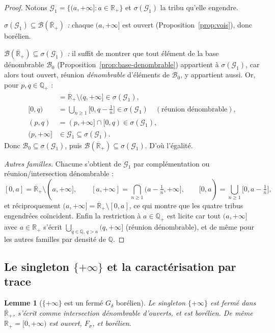 \documentclass[11pt,a4paper]{article}
\theoremstyle{plain}
\newtheorem{lemma}[theorem]{Lemme}
\theoremstyle{definition}
\newcommand{\Q}{\mathbb{Q}}
\newcommand{\Rp}{\mathbb{R}_+}
\newcommand{\Rpb}{\overline{\mathbb{R}}_+}
\newcommand{\B}{\mathcal{B}}
\newcommand{\sig}{\sigma}
\begin{document}
\begin{proof}
Notons $\mathcal{G}_1=\{(a,+\infty]:a\in\Rp\}$ et $\sig(\mathcal{G}_1)$ la tribu
qu'elle engendre.

\emph{$\sig(\mathcal{G}_1)\subseteq\B(\Rpb)$ :} chaque $(a,+\infty]$ est ouvert
(Proposition~\ref{prop:vois}), donc borélien.

\emph{$\B(\Rpb)\subseteq\sig(\mathcal{G}_1)$ :} il suffit de montrer que tout
élément de la base dénombrable $\mathcal{B}_0$
(Proposition~\ref{prop:base-denombrable}) appartient à $\sig(\mathcal{G}_1)$,
car alors tout ouvert, réunion \emph{dénombrable} d'éléments de $\mathcal{B}_0$,
y appartient aussi. Or, pour $p,q\in\Q_+$ :
\begin{align*}
[0,q]&=\Rpb\setminus(q,+\infty]\in\sig(\mathcal{G}_1),\\
[0,q)&=\bigcup_{n\ge1}\Big[0,q-\tfrac1n\Big]\in\sig(\mathcal{G}_1)
\quad(\text{réunion dénombrable}),\\
(p,q)&=(p,+\infty]\cap[0,q)\in\sig(\mathcal{G}_1),\\
(p,+\infty]&\in\mathcal{G}_1\subseteq\sig(\mathcal{G}_1).
\end{align*}
Donc $\mathcal{B}_0\subseteq\sig(\mathcal{G}_1)$, puis
$\B(\Rpb)\subseteq\sig(\mathcal{G}_1)$. D'où l'égalité.

\emph{Autres familles.} Chacune s'obtient de $\mathcal{G}_1$ par
complémentation ou réunion/intersection dénombrable :
\[
[0,a]=\Rpb\setminus(a,+\infty],\qquad
[a,+\infty]=\bigcap_{n\ge1}\Big(a-\tfrac1n,+\infty\Big],\qquad
[0,a)=\bigcup_{n\ge1}\Big[0,a-\tfrac1n\Big],
\]
et réciproquement $(a,+\infty]=\Rpb\setminus[0,a]$, ce qui montre que les
quatre tribus engendrées coïncident. Enfin la restriction à $a\in\Q_+$ est
licite car tout $(a,+\infty]$ avec $a\in\Rp$ s'écrit
$\bigcup_{q\in\Q,\,q>a}(q,+\infty]$ (réunion dénombrable), et de même pour les
autres familles par densité de $\Q$.
\end{proof}

\subsection{Le singleton $\{+\infty\}$ et la caractérisation par trace}

\begin{lemma}[$\{+\infty\}$ est un fermé $G_\delta$ borélien]\label{lem:infty-borel}
Le singleton $\{+\infty\}$ est fermé dans $\Rpb$, s'écrit comme intersection
dénombrable d'ouverts, et est borélien. De même $\Rp=[0,+\infty)$ est ouvert,
$F_\sigma$, et borélien.
\end{lemma}
\end{document}
